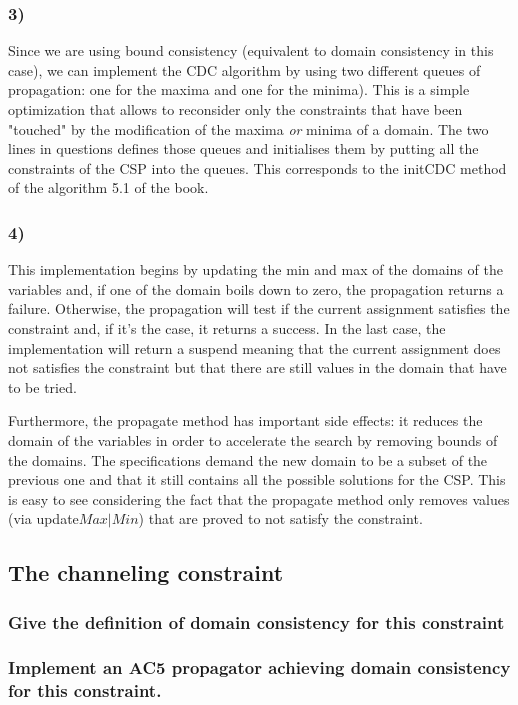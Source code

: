\documentclass[a4paper ,12pt,french]{article}
\begin{document}
\subsubsection{3)}
Since we are using bound consistency (equivalent to domain consistency in this case), we can implement the CDC algorithm by using two different queues of propagation: one for the maxima and one for the minima). This is a simple optimization that allows to reconsider only the constraints that have been "touched" by the modification of the maxima \textit{or} minima of a domain. The two lines in questions defines those queues and initialises them by putting all the constraints of the CSP into the queues. This corresponds to the initCDC method of the algorithm 5.1 of the book.
\subsubsection{4)}
This implementation begins by updating the min and max of the domains of the variables and, if one of the domain boils down to zero, the propagation returns a failure. Otherwise, the propagation will test if the current assignment satisfies the constraint and, if it's the case, it returns a success. 
In the last case, the implementation will return a suspend meaning that the current assignment does not satisfies the constraint but that there are still values in the domain that have to be tried. 

Furthermore, the propagate method has important side effects: it reduces the domain of the variables in order to accelerate the search by removing bounds of the domains. The specifications demand the new domain to be a subset of the previous one and that it still contains all the possible solutions for the CSP. This is easy to see considering the fact that the propagate method only removes values (via update$Max\vert Min$) that are proved to not satisfy the constraint.


\subsection{The channeling constraint}
\subsubsection{Give the definition of domain consistency for this constraint}
\subsubsection{Implement an AC5 propagator achieving domain consistency for this constraint.}
\end{document}
